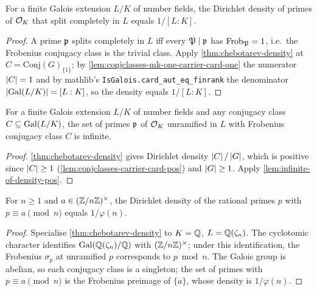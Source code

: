 \begin{corollary}\label{cor:density-split-completely}
  For a finite Galois extension $L/K$ of number fields, the Dirichlet
  density of primes of $\mathcal{O}_K$ that split completely in $L$ equals
  $1/[L:K]$.
\end{corollary}

\begin{proof}
  A prime $\mathfrak{p}$ splits completely in $L$ iff every $\mathfrak{P} \mid \mathfrak{p}$ has
  $\mathrm{Frob}_{\mathfrak{P}} = 1$, i.e.\ the Frobenius conjugacy class is the trivial
  class. Apply \cref{thm:chebotarev-density} at $C = \mathrm{Conj}(G)_{\{1\}}$;
  by \cref{lem:conjclasses-mk-one-carrier-card-one} the numerator
  $\left\lvert C \right\rvert = 1$ and by mathlib's \texttt{IsGalois.card\_aut\_eq\_finrank}
  the denominator $\left\lvert \mathrm{Gal}(L/K) \right\rvert = [L:K]$, so the density equals
  $1/[L:K]$.
\end{proof}

\begin{corollary}\label{cor:infinite-frobenius-class}
  For a finite Galois extension $L/K$ of number fields and any conjugacy
  class $C \subseteq \mathrm{Gal}(L/K)$, the set of primes $\mathfrak{p}$ of $\mathcal{O}_K$
  unramified in $L$ with Frobenius conjugacy class $C$ is infinite.
\end{corollary}

\begin{proof}
  \cref{thm:chebotarev-density} gives Dirichlet density
  $\left\lvert C \right\rvert/\left\lvert G \right\rvert$, which is positive since $\left\lvert C \right\rvert \ge 1$
  (\cref{lem:conjclasses-carrier-card-pos}) and $\left\lvert G \right\rvert \ge 1$. Apply
  \cref{lem:infinite-of-density-pos}.
\end{proof}

\begin{corollary}\label{cor:dirichlet-ap-density}
  For $n \ge 1$ and $a \in (\mathbb{Z}/n\mathbb{Z})^\times$, the Dirichlet density of
  the rational primes $p$ with $p \equiv a \pmod{n}$ equals
  $1/\varphi(n)$.
\end{corollary}

\begin{proof}
  Specialise \cref{thm:chebotarev-density} to $K = \mathbb{Q}$, $L = \mathbb{Q}(\zeta_n)$.
  The cyclotomic character identifies $\mathrm{Gal}(\mathbb{Q}(\zeta_n)/\mathbb{Q})$ with
  $(\mathbb{Z}/n\mathbb{Z})^\times$; under this identification, the Frobenius
  $\sigma_p$ at unramified $p$ corresponds to $p \bmod n$. The Galois
  group is abelian, so each conjugacy class is a singleton; the set of
  primes with $p \equiv a \pmod{n}$ is the Frobenius preimage of
  $\{a\}$, whose density is $1/\varphi(n)$.
\end{proof}
